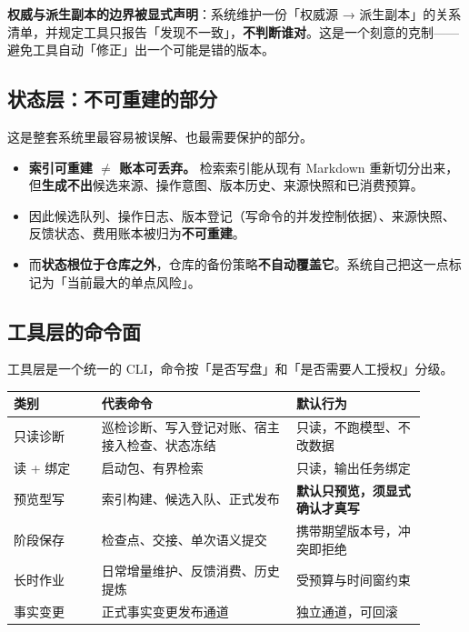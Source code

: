 \documentclass[11pt,a4paper]{ctexart}
\begin{document}
\textbf{权威与派生副本的边界被显式声明}：系统维护一份「权威源 → 派生副本」的关系清单，并规定工具只报告「发现不一致」，\textbf{不判断谁对}。这是一个刻意的克制——避免工具自动「修正」出一个可能是错的版本。

\subsection{状态层：不可重建的部分}

这是整套系统里最容易被误解、也最需要保护的部分。

\begin{itemize}
  \item \textbf{索引可重建 $\neq$ 账本可丢弃。} 检索索引能从现有 Markdown 重新切分出来，但\textbf{生成不出}候选来源、操作意图、版本历史、来源快照和已消费预算。
  \item 因此候选队列、操作日志、版本登记（写命令的并发控制依据）、来源快照、反馈状态、费用账本被归为\textbf{不可重建}。
  \item 而\textbf{状态根位于仓库之外}，仓库的备份策略\textbf{不自动覆盖它}。系统自己把这一点标记为「当前最大的单点风险」。
\end{itemize}

\subsection{工具层的命令面}

工具层是一个统一的 CLI，命令按「是否写盘」和「是否需要人工授权」分级。

\begin{center}
\begin{tabular}{@{}p{0.19\linewidth}p{0.42\linewidth}p{0.29\linewidth}@{}}
\toprule
\textbf{类别} & \textbf{代表命令} & \textbf{默认行为} \\
\midrule
只读诊断 & 巡检诊断、写入登记对账、宿主接入检查、状态冻结 & 只读，不跑模型、不改数据 \\
读 + 绑定 & 启动包、有界检索 & 只读，输出任务绑定 \\
预览型写 & 索引构建、候选入队、正式发布 & \textbf{默认只预览，须显式确认才真写} \\
阶段保存 & 检查点、交接、单次语义提交 & 携带期望版本号，冲突即拒绝 \\
长时作业 & 日常增量维护、反馈消费、历史提炼 & 受预算与时间窗约束 \\
事实变更 & 正式事实变更发布通道 & 独立通道，可回滚 \\
\bottomrule
\end{tabular}
\end{center}
\end{document}
